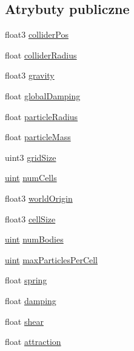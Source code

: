 \subsection*{Atrybuty publiczne}
\begin{DoxyCompactItemize}
\item 
float3 \hyperlink{struct_sim_params_aa27be265020f137f0a9cfbc3f1d2d9f8}{collider\-Pos}
\item 
float \hyperlink{struct_sim_params_a06ca2162f6f0aec08343db6ed8cd4478}{collider\-Radius}
\item 
float3 \hyperlink{struct_sim_params_ae7508eba5dd90859215b59d19e001bb9}{gravity}
\item 
float \hyperlink{struct_sim_params_a7058bad8c867d9d42d8c9d842638ebea}{global\-Damping}
\item 
float \hyperlink{struct_sim_params_a7e131c24e1020c44173deb0f57a8c4af}{particle\-Radius}
\item 
float \hyperlink{struct_sim_params_afab015432bd796517e5f540f6f7228e4}{particle\-Mass}
\item 
uint3 \hyperlink{struct_sim_params_a4cfb18ff777876da3ad69aae6e023949}{grid\-Size}
\item 
\hyperlink{particles__kernel_8cuh_a91ad9478d81a7aaf2593e8d9c3d06a14}{uint} \hyperlink{struct_sim_params_a9d51112b7e86d46b6f33126a67cc84b4}{num\-Cells}
\item 
float3 \hyperlink{struct_sim_params_a1ed7465773f15f2874650f19cec3d0a9}{world\-Origin}
\item 
float3 \hyperlink{struct_sim_params_ad5d71ad4ba6acc829a35f47b3da3e169}{cell\-Size}
\item 
\hyperlink{particles__kernel_8cuh_a91ad9478d81a7aaf2593e8d9c3d06a14}{uint} \hyperlink{struct_sim_params_adb68e9ee2422208807756b367efdf842}{num\-Bodies}
\item 
\hyperlink{particles__kernel_8cuh_a91ad9478d81a7aaf2593e8d9c3d06a14}{uint} \hyperlink{struct_sim_params_a557e8042b00135073cd51fabf4594142}{max\-Particles\-Per\-Cell}
\item 
float \hyperlink{struct_sim_params_a301314921adc7bce20d8955cf03cdf3f}{spring}
\item 
float \hyperlink{struct_sim_params_abf1644c671e60ebaf873d9167e755328}{damping}
\item 
float \hyperlink{struct_sim_params_ad48210724ada15a14a649b25ad61575b}{shear}
\item 
float \hyperlink{struct_sim_params_acf7442ae8a49237861944271cb630d01}{attraction}
\item 

\end{DoxyCompactItemize}
